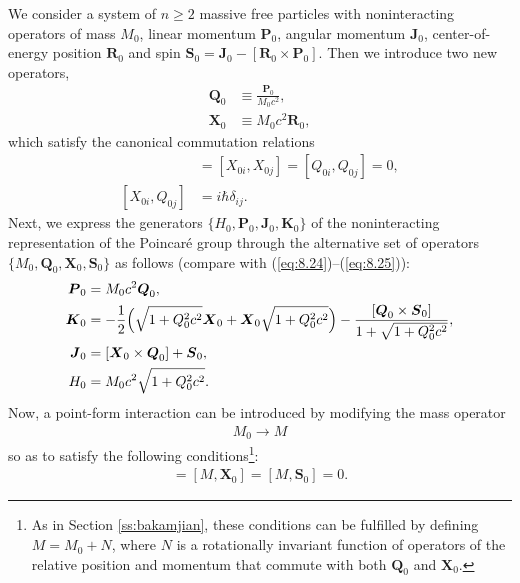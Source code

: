 \documentclass[]{stefan1}
\begin{document}
We consider a system of $ n \geq 2 $ massive free particles with
noninteracting operators of mass $ M_{0} $, linear momentum
$ \boldsymbol{P} _{0} $, angular momentum $ \boldsymbol{J} _{0} $,
center-of-energy position $ \boldsymbol{R} _{0} $ and spin $
\boldsymbol{S} _{0} = \boldsymbol{J} _{0} - [\boldsymbol{R} _{0}
\times \boldsymbol{P} _{0}] $. Then we introduce two new operators,
%
\begin{align*}
\boldsymbol{Q}_{0} &\equiv \frac{\boldsymbol{P}_{0}}{ M_{0} c^{2}},
\\
\boldsymbol{X}_{0} &\equiv M_{0} c^{2}
\boldsymbol{R}_{0},
\end{align*}
which satisfy the canonical commutation relations
%
\begin{align*}
[X_{0i}, Q_{0i}] &= [X_{0i}, X_{0j}]
= [Q_{0i}, Q_{0j}] = 0,
\\
[X_{0i}, Q_{0j}] &= i \hbar \delta_{ij}.
\end{align*}
Next, we express the generators $ \{H_{0}, \boldsymbol{P} _{0},
\boldsymbol{J} _{0}, \boldsymbol{K} _{0} \} $ of the noninteracting
representation of the Poincar\'{e} group through the alternative set of
operators $ \{M_{0}, \boldsymbol{Q} _{0}, \boldsymbol{X} _{0},
\boldsymbol{S} _{0} \} $ as follows (compare with (\ref{eq:8.24})--(\ref{eq:8.25})):
%
\begin{align*}
\boldsymbol{P}_{0} &= M_{0} c^{2}
\boldsymbol{Q}_{0},
\\
\boldsymbol{K}_{0} &= -\frac{1}{2} \Bigl( \sqrt{1+
Q_{0}^{2}c^{2}} \boldsymbol{X}_{0} +
\boldsymbol{X}_{0} \sqrt{1+ Q_{0}^{2}c^{2}}
\Bigr) - \frac{[\boldsymbol{Q}_{0} \times
\boldsymbol{S}_{0}]}{1 + \sqrt{1+
Q_{0}^{2}c^{2}}},
\\
\boldsymbol{J}_{0} &= [\boldsymbol{X}_{0} \times
\boldsymbol{Q}_{0}] + \boldsymbol{S}_{0},
\\
H_{0} &= M_{0}c^{2} \sqrt{1+
Q_{0}^{2}c^{2}}.
\end{align*}
Now, a point-form interaction can be introduced by modifying the mass
operator
%
\begin{align}
M_{0} \to M \label{eq:mass-mod}
\end{align}
so as to satisfy the following conditions\footnote{As in Section
\ref{ss:bakamjian}, these conditions can be fulfilled by defining
$ M = M_{0} + N $, where $ N $ is a rotationally invariant function of
operators of the relative position and momentum that commute with both
$ \boldsymbol{Q} _{0} $ and $ \boldsymbol{X} _{0} $.}:
%
\begin{align*}
[M, \boldsymbol{Q}_{0}] = [M, \boldsymbol{X}_{0}] = [M,
\boldsymbol{S}_{0}] = 0.
\end{align*}
\end{document}
